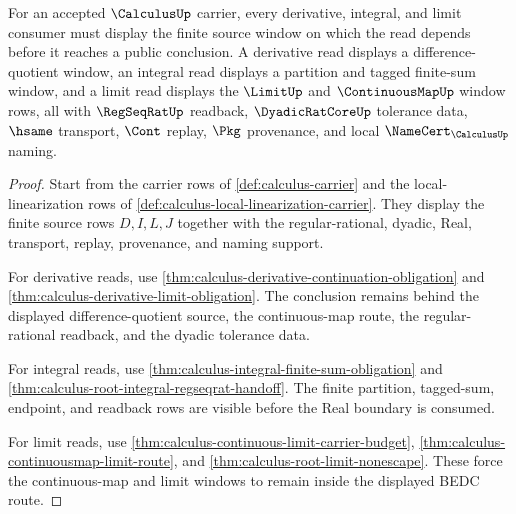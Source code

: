 \begin{theorem}
\label{thm:calculus-source-window-obligation}
For an accepted $\CalculusUp$ carrier, every derivative, integral, and limit consumer must display the finite source window on which the read depends before it reaches a public conclusion. A derivative read displays a difference-quotient window, an integral read displays a partition and tagged finite-sum window, and a limit read displays the $\LimitUp$ and $\ContinuousMapUp$ window rows, all with $\RegSeqRatUp$ readback, $\DyadicRatCoreUp$ tolerance data, $\hsame$ transport, $\Cont$ replay, $\Pkg$ provenance, and local $\NameCert_{\CalculusUp}$ naming.
\end{theorem}
\begin{proof}
Start from the carrier rows of \autoref{def:calculus-carrier} and the local-linearization rows of \autoref{def:calculus-local-linearization-carrier}. They display the finite source rows $D,I,L,J$ together with the regular-rational, dyadic, Real, transport, replay, provenance, and naming support.

For derivative reads, use \autoref{thm:calculus-derivative-continuation-obligation} and \autoref{thm:calculus-derivative-limit-obligation}. The conclusion remains behind the displayed difference-quotient source, the continuous-map route, the regular-rational readback, and the dyadic tolerance data.

For integral reads, use \autoref{thm:calculus-integral-finite-sum-obligation} and \autoref{thm:calculus-root-integral-regseqrat-handoff}. The finite partition, tagged-sum, endpoint, and readback rows are visible before the Real boundary is consumed.

For limit reads, use \autoref{thm:calculus-continuous-limit-carrier-budget}, \autoref{thm:calculus-continuousmap-limit-route}, and \autoref{thm:calculus-root-limit-nonescape}. These force the continuous-map and limit windows to remain inside the displayed BEDC route.
\end{proof}

